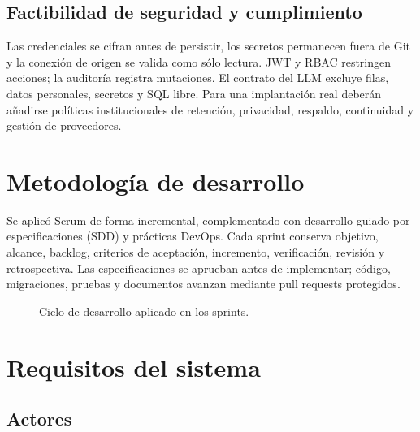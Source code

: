 \documentclass[11pt,letterpaper]{article}
\begin{document}
\subsection{Factibilidad de seguridad y cumplimiento}

Las credenciales se cifran antes de persistir, los secretos permanecen fuera de Git y la conexión de origen se valida como sólo lectura. JWT y RBAC restringen acciones; la auditoría registra mutaciones. El contrato del LLM excluye filas, datos personales, secretos y SQL libre. Para una implantación real deberán añadirse políticas institucionales de retención, privacidad, respaldo, continuidad y gestión de proveedores.

\section{Metodología de desarrollo}

Se aplicó Scrum de forma incremental, complementado con desarrollo guiado por especificaciones (SDD) y prácticas DevOps. Cada sprint conserva objetivo, alcance, backlog, criterios de aceptación, incremento, verificación, revisión y retrospectiva. Las especificaciones se aprueban antes de implementar; código, migraciones, pruebas y documentos avanzan mediante pull requests protegidos.

\begin{figure}[ht]
\centering
{}
\caption{Ciclo de desarrollo aplicado en los sprints.}
\end{figure}

\section{Requisitos del sistema}

\subsection{Actores}
\end{document}
